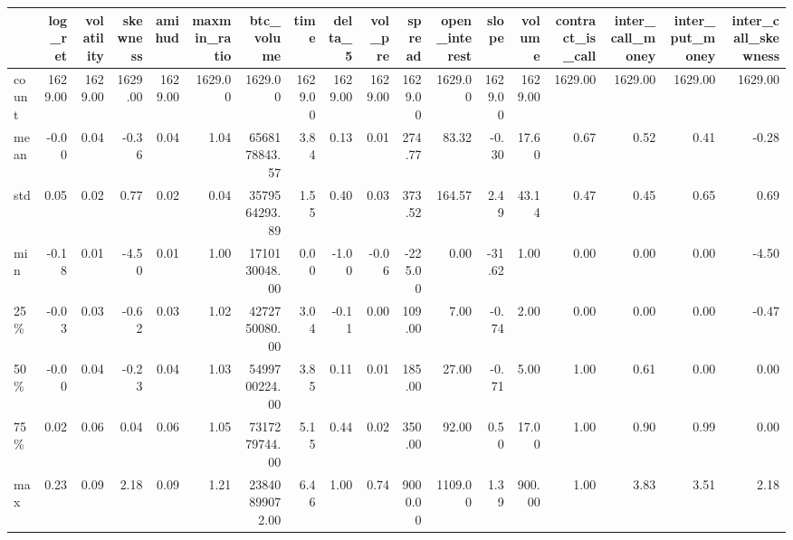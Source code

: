 \begin{tabular}{lrrrrrrrrrrrrrrrrr}
\toprule
{} &  log\_ret &  volatility &  skewness &  amihud &  maxmin\_ratio &     btc\_volume &    time &  delta\_5 &  vol\_pre &  spread &  open\_interest &   slope &  volume &  contract\_is\_call &  inter\_call\_money &  inter\_put\_money &  inter\_call\_skewness \\
\midrule
count &  1629.00 &     1629.00 &   1629.00 & 1629.00 &       1629.00 &        1629.00 & 1629.00 &  1629.00 &  1629.00 & 1629.00 &        1629.00 & 1629.00 & 1629.00 &           1629.00 &           1629.00 &          1629.00 &              1629.00 \\
mean  &    -0.00 &        0.04 &     -0.36 &    0.04 &          1.04 &  6568178843.57 &    3.84 &     0.13 &     0.01 &  274.77 &          83.32 &   -0.30 &   17.60 &              0.67 &              0.52 &             0.41 &                -0.28 \\
std   &     0.05 &        0.02 &      0.77 &    0.02 &          0.04 &  3579564293.89 &    1.55 &     0.40 &     0.03 &  373.52 &         164.57 &    2.49 &   43.14 &              0.47 &              0.45 &             0.65 &                 0.69 \\
min   &    -0.18 &        0.01 &     -4.50 &    0.01 &          1.00 &  1710130048.00 &    0.00 &    -1.00 &    -0.06 & -225.00 &           0.00 &  -31.62 &    1.00 &              0.00 &              0.00 &             0.00 &                -4.50 \\
25\%   &    -0.03 &        0.03 &     -0.62 &    0.03 &          1.02 &  4272750080.00 &    3.04 &    -0.11 &     0.00 &  109.00 &           7.00 &   -0.74 &    2.00 &              0.00 &              0.00 &             0.00 &                -0.47 \\
50\%   &    -0.00 &        0.04 &     -0.23 &    0.04 &          1.03 &  5499700224.00 &    3.85 &     0.11 &     0.01 &  185.00 &          27.00 &   -0.71 &    5.00 &              1.00 &              0.61 &             0.00 &                 0.00 \\
75\%   &     0.02 &        0.06 &      0.04 &    0.06 &          1.05 &  7317279744.00 &    5.15 &     0.44 &     0.02 &  350.00 &          92.00 &    0.50 &   17.00 &              1.00 &              0.90 &             0.99 &                 0.00 \\
max   &     0.23 &        0.09 &      2.18 &    0.09 &          1.21 & 23840899072.00 &    6.46 &     1.00 &     0.74 & 9000.00 &        1109.00 &    1.39 &  900.00 &              1.00 &              3.83 &             3.51 &                 2.18 \\
\bottomrule
\end{tabular}
